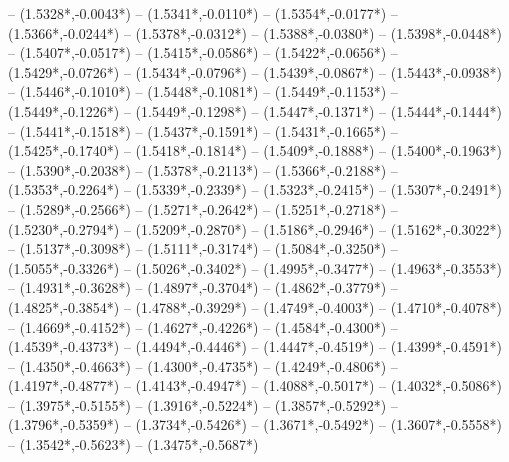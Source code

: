 {	-- ({1.5328*\dx},{-0.0043*\dy})
	-- ({1.5341*\dx},{-0.0110*\dy})
	-- ({1.5354*\dx},{-0.0177*\dy})
	-- ({1.5366*\dx},{-0.0244*\dy})
	-- ({1.5378*\dx},{-0.0312*\dy})
	-- ({1.5388*\dx},{-0.0380*\dy})
	-- ({1.5398*\dx},{-0.0448*\dy})
	-- ({1.5407*\dx},{-0.0517*\dy})
	-- ({1.5415*\dx},{-0.0586*\dy})
	-- ({1.5422*\dx},{-0.0656*\dy})
	-- ({1.5429*\dx},{-0.0726*\dy})
	-- ({1.5434*\dx},{-0.0796*\dy})
	-- ({1.5439*\dx},{-0.0867*\dy})
	-- ({1.5443*\dx},{-0.0938*\dy})
	-- ({1.5446*\dx},{-0.1010*\dy})
	-- ({1.5448*\dx},{-0.1081*\dy})
	-- ({1.5449*\dx},{-0.1153*\dy})
	-- ({1.5449*\dx},{-0.1226*\dy})
	-- ({1.5449*\dx},{-0.1298*\dy})
	-- ({1.5447*\dx},{-0.1371*\dy})
	-- ({1.5444*\dx},{-0.1444*\dy})
	-- ({1.5441*\dx},{-0.1518*\dy})
	-- ({1.5437*\dx},{-0.1591*\dy})
	-- ({1.5431*\dx},{-0.1665*\dy})
	-- ({1.5425*\dx},{-0.1740*\dy})
	-- ({1.5418*\dx},{-0.1814*\dy})
	-- ({1.5409*\dx},{-0.1888*\dy})
	-- ({1.5400*\dx},{-0.1963*\dy})
	-- ({1.5390*\dx},{-0.2038*\dy})
	-- ({1.5378*\dx},{-0.2113*\dy})
	-- ({1.5366*\dx},{-0.2188*\dy})
	-- ({1.5353*\dx},{-0.2264*\dy})
	-- ({1.5339*\dx},{-0.2339*\dy})
	-- ({1.5323*\dx},{-0.2415*\dy})
	-- ({1.5307*\dx},{-0.2491*\dy})
	-- ({1.5289*\dx},{-0.2566*\dy})
	-- ({1.5271*\dx},{-0.2642*\dy})
	-- ({1.5251*\dx},{-0.2718*\dy})
	-- ({1.5230*\dx},{-0.2794*\dy})
	-- ({1.5209*\dx},{-0.2870*\dy})
	-- ({1.5186*\dx},{-0.2946*\dy})
	-- ({1.5162*\dx},{-0.3022*\dy})
	-- ({1.5137*\dx},{-0.3098*\dy})
	-- ({1.5111*\dx},{-0.3174*\dy})
	-- ({1.5084*\dx},{-0.3250*\dy})
	-- ({1.5055*\dx},{-0.3326*\dy})
	-- ({1.5026*\dx},{-0.3402*\dy})
	-- ({1.4995*\dx},{-0.3477*\dy})
	-- ({1.4963*\dx},{-0.3553*\dy})
	-- ({1.4931*\dx},{-0.3628*\dy})
	-- ({1.4897*\dx},{-0.3704*\dy})
	-- ({1.4862*\dx},{-0.3779*\dy})
	-- ({1.4825*\dx},{-0.3854*\dy})
	-- ({1.4788*\dx},{-0.3929*\dy})
	-- ({1.4749*\dx},{-0.4003*\dy})
	-- ({1.4710*\dx},{-0.4078*\dy})
	-- ({1.4669*\dx},{-0.4152*\dy})
	-- ({1.4627*\dx},{-0.4226*\dy})
	-- ({1.4584*\dx},{-0.4300*\dy})
	-- ({1.4539*\dx},{-0.4373*\dy})
	-- ({1.4494*\dx},{-0.4446*\dy})
	-- ({1.4447*\dx},{-0.4519*\dy})
	-- ({1.4399*\dx},{-0.4591*\dy})
	-- ({1.4350*\dx},{-0.4663*\dy})
	-- ({1.4300*\dx},{-0.4735*\dy})
	-- ({1.4249*\dx},{-0.4806*\dy})
	-- ({1.4197*\dx},{-0.4877*\dy})
	-- ({1.4143*\dx},{-0.4947*\dy})
	-- ({1.4088*\dx},{-0.5017*\dy})
	-- ({1.4032*\dx},{-0.5086*\dy})
	-- ({1.3975*\dx},{-0.5155*\dy})
	-- ({1.3916*\dx},{-0.5224*\dy})
	-- ({1.3857*\dx},{-0.5292*\dy})
	-- ({1.3796*\dx},{-0.5359*\dy})
	-- ({1.3734*\dx},{-0.5426*\dy})
	-- ({1.3671*\dx},{-0.5492*\dy})
	-- ({1.3607*\dx},{-0.5558*\dy})
	-- ({1.3542*\dx},{-0.5623*\dy})
	-- ({1.3475*\dx},{-0.5687*\dy})
}
